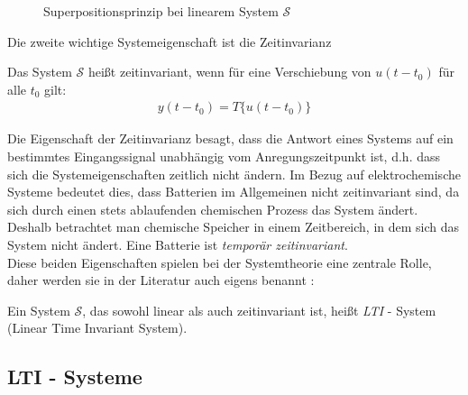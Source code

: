 \begin{figure}[ht]
	\centering
	\def\svgwidth{0.75\columnwidth}
	
	\caption{Superpositionsprinzip bei linearem System $\mathscr{S}$ \cite{Frey2009}}
	\label{fig:superpos}
\end{figure}
Die zweite wichtige Systemeigenschaft ist die Zeitinvarianz
\begin{defi}\label{sys:timeinvarianz}
Das System $\mathscr{S}$ heißt zeitinvariant, wenn für eine Verschiebung von $u(t-t_0)$ für alle $t_0$ gilt:
\begin{align}
	y(t-t_0) = T\{u(t-t_0)\}
\end{align}
\end{defi}
Die Eigenschaft der Zeitinvarianz besagt, dass die Antwort eines Systems auf ein bestimmtes Eingangssignal unabhängig vom Anregungszeitpunkt ist, d.h. dass sich die Systemeigenschaften zeitlich nicht ändern. Im Bezug auf elektrochemische Systeme bedeutet dies, dass Batterien im Allgemeinen nicht zeitinvariant sind, da sich durch einen stets ablaufenden chemischen Prozess das System ändert. Deshalb betrachtet man chemische Speicher in einem Zeitbereich, in dem sich das System nicht ändert. Eine Batterie ist \textit{temporär zeitinvariant}.\\

Diese beiden Eigenschaften spielen bei der Systemtheorie eine zentrale Rolle, daher werden sie in der Literatur auch eigens benannt \cite{Frey2009}:
\begin{defi}
Ein System $\mathscr{S}$, das sowohl linear als auch zeitinvariant ist, heißt \textit{LTI} - System (Linear Time Invariant System).
\end{defi}

\subsection{LTI - Systeme}
